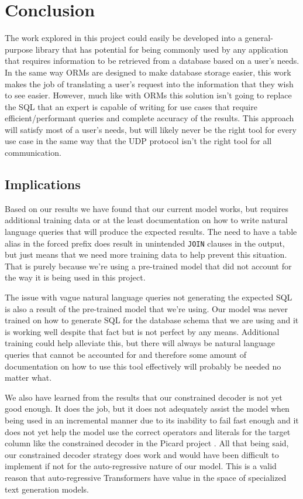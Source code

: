 \documentclass[11pt]{article}
\begin{document}
\section{Conclusion}

The work explored in this project could easily be developed into a general-purpose library that has potential for being commonly used by any application that requires information to be retrieved from a database based on a user's needs. In the same way ORMs are designed to make database storage easier, this work makes the job of translating a user's request into the information that they wish to see easier. However, much like with ORMs this solution isn't going to replace the SQL that an expert is capable of writing for use cases that require efficient/performant queries and complete accuracy of the results. This approach will satisfy most of a user's needs, but will likely never be the right tool for every use case in the same way that the UDP protocol isn't the right tool for all communication.

\subsection{Implications}

Based on our results we have found that our current model works, but requires additional training data or at the least documentation on how to write natural language queries that will produce the expected results. The need to have a table alias in the forced prefix does result in unintended \texttt{JOIN} clauses in the output, but just means that we need more training data to help prevent this situation. That is purely because we're using a pre-trained model that did not account for the way it is being used in this project.

The issue with vague natural language queries not generating the expected SQL is also a result of the pre-trained model that we're using. Our model was never trained on how to generate SQL for the database schema that we are using and it is working well despite that fact but is not perfect by any means. Additional training could help alleviate this, but there will always be natural language queries that cannot be accounted for and therefore some amount of documentation on how to use this tool effectively will probably be needed no matter what.

We also have learned from the results that our constrained decoder is not yet good enough. It does the job, but it does not adequately assist the model when being used in an incremental manner due to its inability to fail fast enough and it does not yet help the model use the correct operators and literals for the target column like the constrained decoder in the Picard project \citep{scholak2021picard}. All that being said, our constrained decoder strategy does work and would have been difficult to implement if not for the auto-regressive nature of our model. This is a valid reason that auto-regressive Transformers have value in the space of specialized text generation models.
\end{document}
